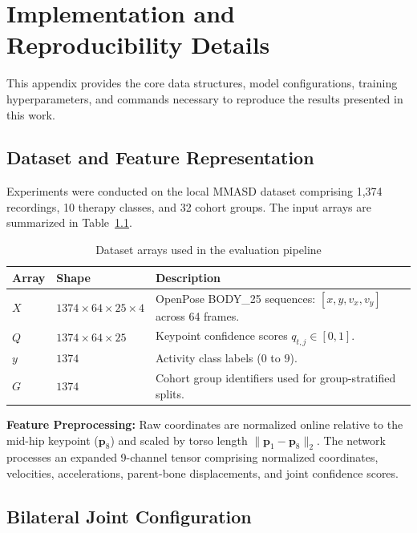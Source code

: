 \appendix
\chapter{Implementation and Reproducibility Details}
\label{app:implementation}

This appendix provides the core data structures, model configurations, training hyperparameters, and commands necessary to reproduce the results presented in this work.

\section{Dataset and Feature Representation}

Experiments were conducted on the local MMASD dataset comprising 1,374 recordings, 10 therapy classes, and 32 cohort groups. The input arrays are summarized in Table~\ref{tab:implementation-inputs}.

\begin{table}[htbp]
\centering
\caption{Dataset arrays used in the evaluation pipeline}
\label{tab:implementation-inputs}
\small
\begin{tabular}{|l|l|p{8.5cm}|}
\hline
\textbf{Array} & \textbf{Shape} & \textbf{Description} \\
\hline
\(X\) & \(1374 \times 64 \times 25 \times 4\) & OpenPose BODY\_25 sequences: \([x, y, v_x, v_y]\) across 64 frames. \\
\hline
\(Q\) & \(1374 \times 64 \times 25\) & Keypoint confidence scores \(q_{t,j} \in [0, 1]\). \\
\hline
\(y\) & \(1374\) & Activity class labels (\(0\) to \(9\)). \\
\hline
\(G\) & \(1374\) & Cohort group identifiers used for group-stratified splits. \\
\hline
\end{tabular}
\end{table}

\textbf{Feature Preprocessing:} Raw coordinates are normalized online relative to the mid-hip keypoint ($\mathbf{p}_8$) and scaled by torso length $\|\mathbf{p}_1 - \mathbf{p}_8\|_2$. The network processes an expanded 9-channel tensor comprising normalized coordinates, velocities, accelerations, parent-bone displacements, and joint confidence scores.

\section{Bilateral Joint Configuration}


